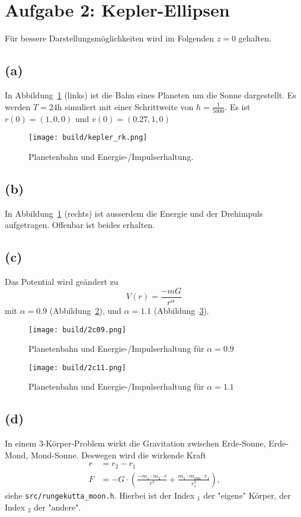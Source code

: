 \documentclass{scrartcl}
\begin{document}
\section*{Aufgabe 2: Kepler-Ellipsen}
Für bessere Darstellungsmöglichkeiten wird im Folgenden $z = 0$ gehalten.
\subsection*{(a)}

In Abbildung~\ref{fig:kepler} (links) ist die Bahn eines Planeten um die Sonne dargestellt.
Es werden $T= 24$h simuliert mit einer Schrittweite von $h = \frac{1}{5000}$.
Es ist $r(0) = (1, 0, 0)$ und $v(0) = (0.27, 1, 0)$
\begin{figure}[ht]
  \centering
  \texttt{[image: build/kepler\_rk.png]}
  \caption{Planetenbahn und Energie-/Impulserhaltung.}%
  \label{fig:kepler}
\end{figure}
\subsection*{(b)}
In Abbildung~\ref{fig:kepler} (rechts) ist ausserdem die Energie und der Drehimpuls aufgetragen.
Offenbar ist beides erhalten.
\subsection*{(c)}
Das Potential wird geändert zu
\begin{equation}
  V(r) = \frac{-mG}{r^\alpha}
\end{equation}
mit $\alpha = 0.9$ (Abbildung~\ref{fig:2c09}),
und $\alpha = 1.1$ (Abbildung~\ref{fig:2c11}).
\begin{figure}[ht]
  \centering
  \texttt{[image: build/2c09.png]}
  \caption{Planetenbahn und Energie-/Impulserhaltung für $\alpha = 0.9$}%
  \label{fig:2c09}
\end{figure}
\begin{figure}[ht]
  \centering
  \texttt{[image: build/2c11.png]}
  \caption{Planetenbahn und Energie-/Impulserhaltung für $\alpha = 1.1$}%
  \label{fig:2c11}
\end{figure}
\subsection*{(d)}
In einem 3-Körper-Problem wirkt die Gravitation zwischen Erde-Sonne, Erde-Mond, Mond-Sonne.
Deswegen wird die wirkende Kraft
\begin{align}
  r &= r_2 - r_1 \\
  F &= - G \cdot \left(\frac{- m_1 \cdot m_2 \cdot r}{r^3} + \frac{m_1 \cdot m_{\text{sun}} \cdot
    r_1}{r_1^3}\right)\text{,}
\end{align}
siehe \texttt{src/rungekutta\_moon.h}.
Hierbei ist der Index ${}_1$ der "eigene" Körper,
der Index ${}_2$ der "andere".
\end{document}

